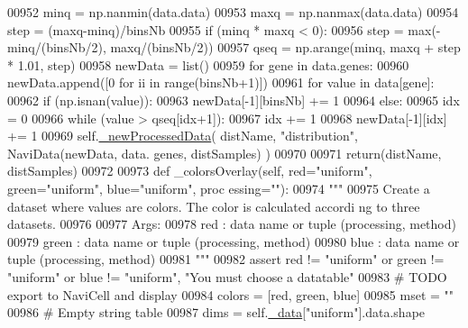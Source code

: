 \begin{DoxyCode}
00952         minq = np.nanmin(data.data)
00953         maxq = np.nanmax(data.data)
00954         step = (maxq-minq)/binsNb
00955         \textcolor{keywordflow}{if} (minq * maxq < 0):
00956             step = max(-minq/(binsNb/2), maxq/(binsNb/2))
00957         qseq = np.arange(minq, maxq + step * 1.01, step)
00958         newData = list()
00959         \textcolor{keywordflow}{for} gene \textcolor{keywordflow}{in} data.genes:
00960             newData.append([0 \textcolor{keywordflow}{for} ii \textcolor{keywordflow}{in} range(binsNb+1)])
00961             \textcolor{keywordflow}{for} value \textcolor{keywordflow}{in} data[gene]:
00962                 \textcolor{keywordflow}{if} (np.isnan(value)):
00963                     newData[-1][binsNb] += 1
00964                 \textcolor{keywordflow}{else}:
00965                     idx = 0
00966                     \textcolor{keywordflow}{while} (value > qseq[idx+1]):
00967                         idx += 1
00968                     newData[-1][idx] += 1
00969         self.\hyperlink{classnavicom_1_1navicom_1_1NaviCom_acf8b9094fa76cafefb910daeb68b7e5d}{_newProcessedData}( distName, \textcolor{stringliteral}{"distribution"}, NaviData(newData, data.
      genes, distSamples) )
00970 
00971         \textcolor{keywordflow}{return}(distName, distSamples)
00972 
00973     \textcolor{keyword}{def }\_colorsOverlay(self, red="uniform", green="uniform", blue="uniform", proc
      essing=""):
00974         \textcolor{stringliteral}{"""}
00975 \textcolor{stringliteral}{        Create a dataset where values are colors. The color is calculated accordi
      ng to three datasets.}
00976 \textcolor{stringliteral}{}
00977 \textcolor{stringliteral}{        Args:}
00978 \textcolor{stringliteral}{            red : data name or tuple (processing, method)}
00979 \textcolor{stringliteral}{            green : data name or tuple (processing, method)}
00980 \textcolor{stringliteral}{            blue : data name or tuple (processing, method)}
00981 \textcolor{stringliteral}{        """}
00982         \textcolor{keyword}{assert} red != \textcolor{stringliteral}{"uniform"} \textcolor{keywordflow}{or} green != \textcolor{stringliteral}{"uniform"} \textcolor{keywordflow}{or} blue != \textcolor{stringliteral}{"uniform"}, \textcolor{stringliteral}{"You 
      must choose a datatable"}
00983         \textcolor{comment}{# TODO export to NaviCell and display}
00984         colors = [red, green, blue]
00985         mset = \textcolor{stringliteral}{""}
00986         \textcolor{comment}{# Empty string table}
00987         dims = self.\hyperlink{classnavicom_1_1navicom_1_1NaviCom_a407b2b5c30a5652ee85c4be54b3e6679}{_data}[\textcolor{stringliteral}{"uniform"}].data.shape

\end{DoxyCode}
